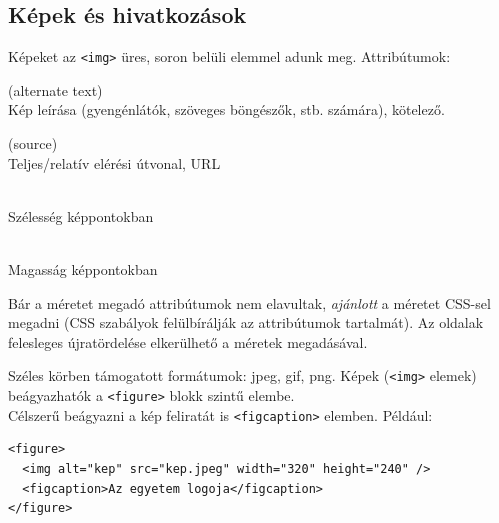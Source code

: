 \subsection{Képek és hivatkozások}

\begin{frame}
  Képeket az \texttt{<img>} üres, soron belüli elemmel adunk meg. Attribútumok:
  \begin{description}[m]
    \item[\texttt{alt}] (alternate text) \hfill \\ Kép leírása (gyengénlátók, szöveges böngészők, stb. számára), kötelező.
    \item[\texttt{src}] (source) \hfill \\ Teljes/relatív elérési útvonal, URL
    \item[\texttt{width}] \hfill \\ Szélesség képpontokban
    \item[\texttt{height}] \hfill \\ Magasság képpontokban
  \end{description}
  Bár a méretet megadó attribútumok nem elavultak, \emph{ajánlott} a méretet CSS-sel megadni (CSS szabályok felülbírálják az attribútumok tartalmát). Az oldalak felesleges újratördelése elkerülhető a méretek megadásával.
\end{frame}

\begin{frame}[fragile]
  Széles körben támogatott formátumok: jpeg, gif, png.
  \vfill
  Képek (\texttt{<img>} elemek) beágyazhatók a \texttt{<figure>} blokk szintű elembe.\\
  Célszerű beágyazni a kép feliratát is \texttt{<figcaption>} elemben.
  \vfill
  Például:
  \begin{verbatim}
<figure>
  <img alt="kep" src="kep.jpeg" width="320" height="240" />
  <figcaption>Az egyetem logoja</figcaption>
</figure>
  \end{verbatim}
\end{frame}

